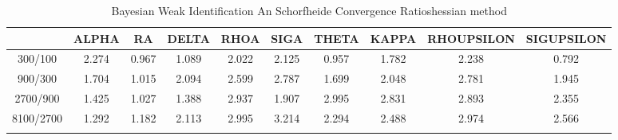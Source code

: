 \documentclass[a4paper,10pt]{article}
\begin{document}
\centering
\begin{longtable}{cccccccccc}
\toprule
 & ALPHA & RA & DELTA & RHOA & SIGA & THETA & KAPPA & RHOUPSILON & SIGUPSILON \\
\midrule
300/100 & 2.274 & 0.967 & 1.089 & 2.022 & 2.125 & 0.957 & 1.782 & 2.238 & 0.792 \\
900/300 & 1.704 & 1.015 & 2.094 & 2.599 & 2.787 & 1.699 & 2.048 & 2.781 & 1.945 \\
2700/900 & 1.425 & 1.027 & 1.388 & 2.937 & 1.907 & 2.995 & 2.831 & 2.893 & 2.355 \\
8100/2700 & 1.292 & 1.182 & 2.113 & 2.995 & 3.214 & 2.294 & 2.488 & 2.974 & 2.566 \\
\bottomrule
\caption{Bayesian Weak Identification An Schorfheide Convergence Ratioshessian method}
\label{table:tbl:WeakAnSchoConvergenceRatios_hessian}
\end{longtable}
\end{document}
